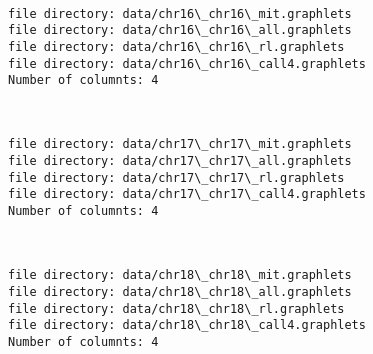 \documentclass[11pt]{article}
\begin{document}
    \begin{center}
    \end{center}
    { \hspace*{\fill} \\}
    
    \begin{Verbatim}[commandchars=\\\{\}]
file directory: data/chr16\_chr16\_mit.graphlets
file directory: data/chr16\_chr16\_all.graphlets
file directory: data/chr16\_chr16\_rl.graphlets
file directory: data/chr16\_chr16\_call4.graphlets
Number of columnts: 4

    \end{Verbatim}

    \begin{center}
    \end{center}
    { \hspace*{\fill} \\}
    
    \begin{Verbatim}[commandchars=\\\{\}]
file directory: data/chr17\_chr17\_mit.graphlets
file directory: data/chr17\_chr17\_all.graphlets
file directory: data/chr17\_chr17\_rl.graphlets
file directory: data/chr17\_chr17\_call4.graphlets
Number of columnts: 4

    \end{Verbatim}

    \begin{center}
    \end{center}
    { \hspace*{\fill} \\}
    
    \begin{Verbatim}[commandchars=\\\{\}]
file directory: data/chr18\_chr18\_mit.graphlets
file directory: data/chr18\_chr18\_all.graphlets
file directory: data/chr18\_chr18\_rl.graphlets
file directory: data/chr18\_chr18\_call4.graphlets
Number of columnts: 4

    \end{Verbatim}

    \begin{center}
    \end{center}
    { \hspace*{\fill} \\}
    
\end{document}
